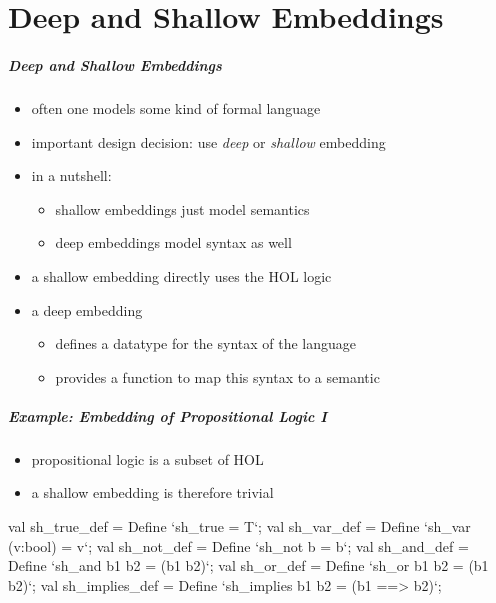 \part{Deep and Shallow Embeddings}

\frame[plain]{\partpage}

\begin{frame}
\frametitle{Deep and Shallow Embeddings}

\begin{itemize}
\item often one models some kind of formal language
\item important design decision: use \emph{deep} or \emph{shallow} embedding
\item in a nutshell:
\begin{itemize}
\item shallow embeddings just model semantics
\item deep embeddings model syntax as well
\end{itemize}
\item a shallow embedding directly uses the HOL logic
\item a deep embedding
\begin{itemize}
\item defines a datatype for the syntax of the language
\item provides a function to map this syntax to a semantic
\end{itemize}
\end{itemize}

\end{frame}


\begin{frame}[fragile]
\frametitle{Example: Embedding of Propositional Logic I}

\begin{itemize}
\item propositional logic is a subset of HOL
\item a shallow embedding is therefore trivial
\end{itemize}

\begin{semiverbatim}\scriptsize
val sh_true_def    = Define `sh_true = T`;
val sh_var_def     = Define `sh_var (v:bool) = v`;
val sh_not_def     = Define `sh_not b = \holNeg{}b`;
val sh_and_def     = Define `sh_and b1 b2 = (b1 \holAnd{} b2)`;
val sh_or_def      = Define `sh_or b1 b2 = (b1 \holOr{} b2)`;
val sh_implies_def = Define `sh_implies b1 b2 = (b1 ==> b2)`;
\end{semiverbatim}

\end{frame}


